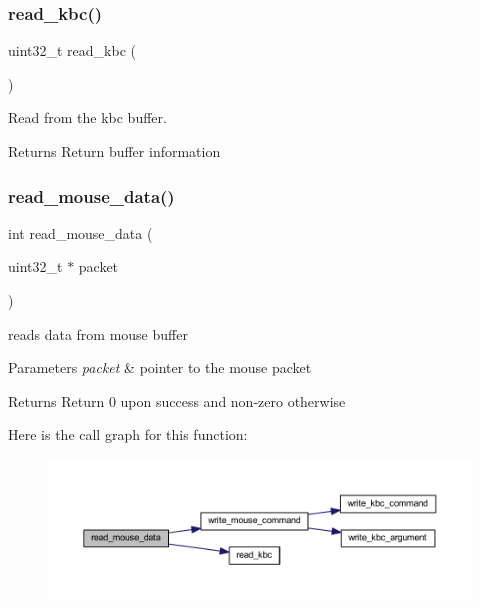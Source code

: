 \subsubsection{\texorpdfstring{read\_kbc()}{read\_kbc()}}
{\footnotesize\ttfamily uint32\+\_\+t read\+\_\+kbc (\begin{DoxyParamCaption}{ }\end{DoxyParamCaption})}



Read from the kbc buffer. 

\begin{DoxyReturn}{Returns}
Return buffer information 
\end{DoxyReturn}
\mbox{\label{group__mouse_ga41c4d2b9b295568179b689915a8acfa8}} 
\subsubsection{\texorpdfstring{read\_mouse\_data()}{read\_mouse\_data()}}
{\footnotesize\ttfamily int read\+\_\+mouse\+\_\+data (\begin{DoxyParamCaption}\item[{uint32\+\_\+t $\ast$}]{packet }\end{DoxyParamCaption})}



reads data from mouse buffer 


\begin{DoxyParams}{Parameters}
{\em packet} & pointer to the mouse packet \\
\hline
\end{DoxyParams}
\begin{DoxyReturn}{Returns}
Return 0 upon success and non-\/zero otherwise 
\end{DoxyReturn}
Here is the call graph for this function\+:
\nopagebreak
\begin{figure}[H]
\begin{center}
\leavevmode
\includegraphics[width=350pt]{group__mouse_ga41c4d2b9b295568179b689915a8acfa8_cgraph}
\end{center}
\end{figure}
\mbox{\label{group__mouse_ga775294026ae46cbb8e4a5d376c0111a2}} 

